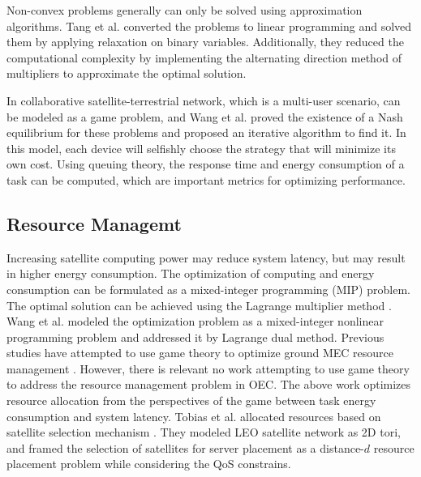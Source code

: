 \documentclass[lettersize,journal]{IEEEtran}
\begin{document}
Non-convex problems generally can only be solved using approximation algorithms. Tang et al. \cite{RN77} converted the problems to linear programming and solved them by applying relaxation on binary variables. Additionally, they reduced the computational complexity by implementing the alternating direction method of multipliers to approximate the optimal solution.

In collaborative satellite-terrestrial network, which is a multi-user scenario, can be modeled as a game problem, and Wang et al. \cite{RN4} proved the existence of a Nash equilibrium for these problems and proposed an iterative algorithm to find it. In this model, each device will selfishly choose the strategy that will minimize its own cost. Using queuing theory, the response time and energy consumption of a task can be computed, which are important metrics for optimizing performance. 

\subsection{Resource Managemt}
Increasing satellite computing power may reduce system latency, but may result in higher energy consumption. The optimization of computing and energy consumption can be formulated as a mixed-integer programming (MIP) problem. The optimal solution can be achieved using the Lagrange multiplier method \cite{RN18, RN78}. Wang et al. \cite{RN80} modeled the optimization problem as a mixed-integer nonlinear programming problem and addressed it by Lagrange dual method. Previous studies have attempted to use game theory to optimize ground MEC resource management \cite{RN245}. However, there is relevant no work attempting to use game theory to address the resource management problem in OEC. The above work optimizes resource allocation from the perspectives of the game between task energy consumption and system latency. 
Tobias et al. allocated resources based on satellite selection mechanism \cite{RN239}. They modeled LEO satellite network as 2D tori, and framed the selection of satellites for server placement as a distance-$d$ resource placement problem while considering the QoS constrains.
\end{document}
